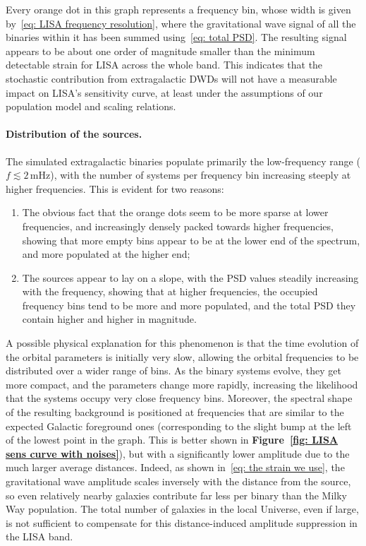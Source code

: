 Every orange dot in this graph represents a frequency bin, whose width is given by~\eqref{eq: LISA frequency resolution}, where the gravitational wave signal of all the binaries within it has been summed using~\eqref{eq: total PSD}.
The resulting signal appears to be about one order of magnitude smaller than the minimum detectable strain for LISA across the whole band.  
This indicates that the stochastic contribution from extragalactic DWDs will not have a measurable impact on LISA’s sensitivity curve, at least under the assumptions of our population model and scaling relations.

\paragraph{Distribution of the sources.}
The simulated extragalactic binaries populate primarily the low-frequency range ($f \lesssim 2\,\mathrm{mHz}$), with the number of systems per frequency bin increasing steeply at higher frequencies. 
This is evident for two reasons:
\begin{enumerate}
    \item The obvious fact that the orange dots seem to be more sparse at lower frequencies, and increasingly densely packed towards higher frequencies, showing that more empty bins appear to be at the lower end of the spectrum, and more populated at the higher end;
    \item The sources appear to lay on a slope, with the PSD values steadily increasing with the frequency, showing that at higher frequencies, the occupied frequency bins tend to be more and more populated, and the total PSD they contain higher and higher in magnitude.
\end{enumerate}
A possible physical explanation for this phenomenon is that the time evolution of the orbital parameters is initially very slow, allowing the orbital frequencies to be distributed over a wider range of bins.
As the binary systems evolve, they get more compact, and the parameters change more rapidly, increasing the likelihood that the systems occupy very close frequency bins.
Moreover, the spectral shape of the resulting background is positioned at frequencies that are similar to the expected Galactic foreground ones (corresponding to the slight bump at the left of the lowest point in the graph. 
This is better shown in \textbf{Figure~\ref{fig: LISA sens curve with noises}}), but with a significantly lower amplitude due to the much larger average distances.
Indeed, as shown in~\eqref{eq: the strain we use}, the gravitational wave amplitude scales inversely with the distance from the source, so even relatively nearby galaxies contribute far less per binary than the Milky Way population. 
The total number of galaxies in the local Universe, even if large, is not sufficient to compensate for this distance-induced amplitude suppression in the LISA band.
